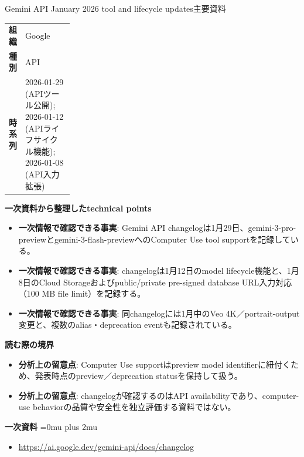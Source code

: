 \begin{technicalnote}{Gemini API January 2026 tool and lifecycle updates}{主要資料}
\begingroup
\begin{tabularx}{\linewidth}{@{}>{\bfseries}p{0.22\linewidth}X@{}}
組織 & Google \\
種別 & API \\
時系列 & 2026-01-29 (APIツール公開); 2026-01-12 (APIライフサイクル機能); 2026-01-08 (API入力拡張) \\
\end{tabularx}
\smallskip
{\bfseries 一次資料から整理したtechnical points}
\begin{itemize}[leftmargin=1.5em,itemsep=0.35em]
\item \textbf{一次情報で確認できる事実}: Gemini API changelogは1月29日、gemini-3-pro-previewとgemini-3-flash-previewへのComputer Use tool supportを記録している。
\item \textbf{一次情報で確認できる事実}: changelogは1月12日のmodel lifecycle機能と、1月8日のCloud Storageおよびpublic/private pre-signed database URL入力対応（100 MB file limit）を記録する。
\item \textbf{一次情報で確認できる事実}: 同changelogには1月中のVeo 4K／portrait-output変更と、複数のalias・deprecation eventも記録されている。
\end{itemize}
\begin{minipage}{\linewidth}
{\bfseries 読む際の境界}
\begin{itemize}[leftmargin=1.5em,itemsep=0.35em]
\item \textbf{分析上の留意点}: Computer Use supportはpreview model identifierに紐付くため、発表時点のpreview／deprecation statusを保持して扱う。
\item \textbf{分析上の留意点}: changelogが確認するのはAPI availabilityであり、computer-use behaviorの品質や安全性を独立評価する資料ではない。
\end{itemize}
\begin{samepage}
{\bfseries 一次資料}
\begingroup\sloppy
\Urlmuskip=0mu plus 2mu\relax
\begin{itemize}[leftmargin=1.5em,itemsep=0.25em]
\item {\scriptsize\url{https://ai.google.dev/gemini-api/docs/changelog}}
\end{itemize}
\endgroup
\end{samepage}
\end{minipage}
\endgroup
\end{technicalnote}
\medskip

